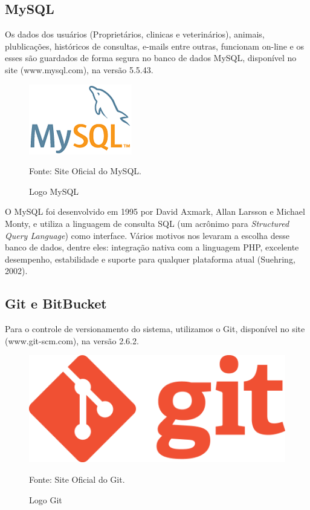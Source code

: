\subsection{MySQL}
Os dados dos usuários (Proprietários, clinicas e veterinários), animais, plublicações, históricos de consultas, e-mails entre outras, funcionam on-line e os esses são guardados de forma segura no banco de dados MySQL, disponível no site (www.mysql.com), na versão 5.5.43. 

\begin{figure}[!htb]
	\centering
	\includegraphics[scale=0.50
	]{imagens/logo-mysql}
	\caption{Logo MySQL}
	Fonte: Site Oficial do MySQL.
	\label{Rotulo}
\end{figure}

O MySQL foi desenvolvido em 1995 por David Axmark, Allan Larsson e Michael Monty, e utiliza a linguagem de consulta SQL (um acrônimo para {\it Structured Query Language}) como interface. Vários motivos nos levaram a escolha desse banco de dados, dentre eles: integração nativa com a linguagem PHP, excelente desempenho, estabilidade e suporte para qualquer plataforma atual (Suehring, 2002).


\subsection{Git e BitBucket}
Para o controle de versionamento do sistema, utilizamos o Git, disponível no site (www.git-scm.com), na versão 2.6.2. 

\begin{figure}[!htb]
	\centering
	\includegraphics[scale=0.10
	]{imagens/logo_git}
	\caption{Logo Git}
	Fonte: Site Oficial do Git.
	\label{Rotulo}
\end{figure}

